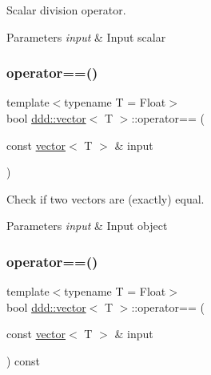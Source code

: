 Scalar division operator. 


\begin{DoxyParams}{Parameters}
{\em input} & Input scalar \\
\hline
\end{DoxyParams}
\mbox{\label{classddd_1_1vector_a5f26a6f471c836b723c94a5f68a3931d}} 
\subsubsection{\texorpdfstring{operator==()}{operator==()}\hspace{0.1cm}{\footnotesize\ttfamily [1/2]}}
{\footnotesize\ttfamily template$<$typename T = Float$>$ \\
bool \hyperlink{classddd_1_1vector}{ddd\+::vector}$<$ T $>$\+::operator== (\begin{DoxyParamCaption}\item[{const \hyperlink{classddd_1_1vector}{vector}$<$ T $>$ \&}]{input }\end{DoxyParamCaption})\hspace{0.3cm}{\ttfamily [inline]}}



Check if two vectors are (exactly) equal. 


\begin{DoxyParams}{Parameters}
{\em input} & Input object \\
\hline
\end{DoxyParams}
\mbox{\label{classddd_1_1vector_a7595b24534ba95d03d9ace253a7c355f}} 
\subsubsection{\texorpdfstring{operator==()}{operator==()}\hspace{0.1cm}{\footnotesize\ttfamily [2/2]}}
{\footnotesize\ttfamily template$<$typename T = Float$>$ \\
bool \hyperlink{classddd_1_1vector}{ddd\+::vector}$<$ T $>$\+::operator== (\begin{DoxyParamCaption}\item[{const \hyperlink{classddd_1_1vector}{vector}$<$ T $>$ \&}]{input }\end{DoxyParamCaption}) const\hspace{0.3cm}{\ttfamily [inline]}}



